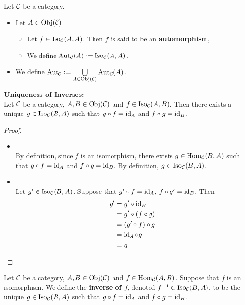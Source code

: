 \documentclass{book}
\begin{document}
	\begin{defn}
		Let $\mathcal{C}$ be a category.
		\begin{itemize}
			\item Let $A \in \operatorname{Obj}(\mathcal{C})$
			\begin{itemize}
				\item Let $f \in \operatorname{Iso}_{\mathcal{C}}(A, A)$. Then $f$ is said to be an \textbf{automorphism},
				\item We define $\operatorname{Aut}_{\mathcal{C}}(A) \vcentcolon= \operatorname{Iso}_{\mathcal{C}}(A, A)$.
			\end{itemize}
			\item We define $\operatorname{Aut}_{\mathcal{C}} \vcentcolon= \bigcup\limits_{A \in \operatorname{Obj}(\mathcal{C})} \operatorname{Aut}_{\mathcal{C}}(A)$.
		\end{itemize}
	\end{defn}
	
	\begin{ex}  \textbf{Uniqueness of Inverses:} \\
		Let $\mathcal{C}$ be a category, $A,B \in \operatorname{Obj}(\mathcal{C})$ and $f \in \operatorname{Iso}_{\mathcal{C}}(A, B)$. Then there exists a unique $g \in \operatorname{Iso}_{\mathcal{C}}(B, A)$ such that $g \circ f = \operatorname{id}_A$ and $f \circ g = \operatorname{id}_B$.
	\end{ex}
	
	\begin{proof}\
		\begin{itemize}
			\item {} \\
			By definition, since $f$ is an isomorphism, there exists $g \in \operatorname{Hom}_{\mathcal{C}}(B, A)$ such that $g \circ f = \operatorname{id}_{A}$ and $f \circ g = \operatorname{id}_B$. By definition, $g \in \operatorname{Iso}_{\mathcal{C}}(B, A)$.
			\item \tbf{Uniqueness: } \\
			Let $g' \in \operatorname{Iso}_{\mathcal{C}}(B, A)$. Suppose that $g' \circ f = \operatorname{id}_A$, $f \circ g' = \operatorname{id}_B$. Then 
			\begin{align*}
				g'
				& = g' \circ \operatorname{id}_{B} \\
				& = g' \circ (f \circ g) \\
				& = (g' \circ f) \circ  g \\
				& = \operatorname{id}_A \circ g \\
				& = g
			\end{align*}
		\end{itemize}
	\end{proof}
	
	\begin{defn} 
		Let $\mathcal{C}$ be a category, $A,B \in \operatorname{Obj}(\mathcal{C})$ and $f \in \operatorname{Hom}_{\mathcal{C}}(A, B)$. Suppose that $f$ is an isomorphism. We define the \textbf{inverse of $f$}, denoted $f^{-1} \in \operatorname{Iso}_{\mathcal{C}}(B, A)$, to be the unique $g \in \operatorname{Iso}_{\mathcal{C}}(B, A)$ such that $g \circ f = \operatorname{id}_A$ and $f \circ g = \operatorname{id}_B$.
	\end{defn}
	
\end{document}

